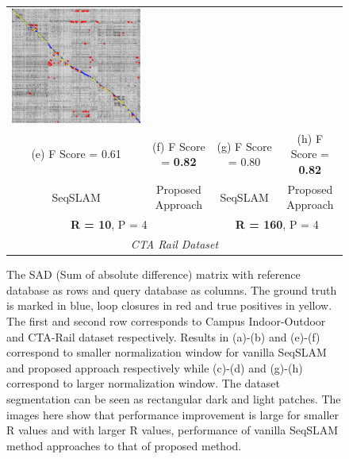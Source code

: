 \documentclass[letterpaper, 10 pt, conference]{ieeeconf}  %
\begin{document}
\begin{figure}[!h]
\begin{tabular*}{\textwidth}[t]{cccc}
  \includegraphics[width=\imgW,height=\imgH]{cta-rail-with-good-310} \\
  (e) F Score = 0.61 & (f) F Score = \textbf{0.82} & (g) F Score = 0.80 & (h) F Score = \textbf{0.82} \\
  SeqSLAM & Proposed Approach & SeqSLAM & Proposed Approach \\
  \multicolumn{2}{c}{\textbf{R = 10}, P = 4} & \multicolumn{2}{c}{\textbf{R = 160}, P = 4} \\
  \multicolumn{4}{c}{\emph{CTA Rail Dataset}} \\
 \end{tabular*}
 \caption{The SAD (Sum of absolute difference) matrix with reference database as rows and query database as columns. The ground truth is marked in blue, loop closures in red and true positives in yellow. The first and second row corresponds to Campus Indoor-Outdoor and CTA-Rail dataset respectively. Results in (a)-(b) and (e)-(f) correspond to smaller normalization window for vanilla SeqSLAM and proposed approach respectively while (c)-(d) and (g)-(h) correspond to larger normalization window. The dataset segmentation can be seen as rectangular dark and light patches. The images here show that performance improvement is large for smaller R values and with larger R values, performance of vanilla SeqSLAM method approaches to that of proposed method.}
 \label{fig:sadMat}

\end{figure}
\end{document}
